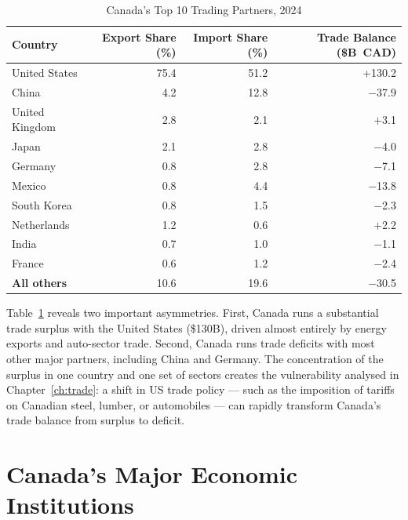 \begin{table}[H]
\centering
\caption{Canada's Top 10 Trading Partners, 2024}
\label{tab:trading_partners}
\renewcommand{\arraystretch}{1.35}
\begin{tabular}{lrrr}
\toprule
\textbf{Country} & \textbf{Export Share (\%)} & \textbf{Import Share (\%)}
                 & \textbf{Trade Balance (\$B~CAD)} \\
\midrule
United States    & 75.4 & 51.2 & +130.2 \\
China            &  4.2 & 12.8 & $-$37.9 \\
United Kingdom   &  2.8 &  2.1 & $+$3.1 \\
Japan            &  2.1 &  2.8 & $-$4.0 \\
Germany          &  0.8 &  2.8 & $-$7.1 \\
Mexico           &  0.8 &  4.4 & $-$13.8 \\
South Korea      &  0.8 &  1.5 & $-$2.3 \\
Netherlands      &  1.2 &  0.6 & $+$2.2 \\
India            &  0.7 &  1.0 & $-$1.1 \\
France           &  0.6 &  1.2 & $-$2.4 \\
\midrule
\textbf{All others} & 10.6 & 19.6 & $-$30.5 \\
\bottomrule
\end{tabular}
\end{table}

\noindent Table~\ref{tab:trading_partners} reveals two important asymmetries.
First, Canada runs a substantial trade surplus with the United States (\$130B),
driven almost entirely by energy exports and auto-sector trade. Second, Canada
runs trade deficits with most other major partners, including China and Germany.
The concentration of the surplus in one country and one set of sectors creates
the vulnerability analysed in Chapter~\ref{ch:trade}: a shift in US trade
policy --- such as the imposition of tariffs on Canadian steel, lumber, or
automobiles --- can rapidly transform Canada's trade balance from surplus
to deficit.

\section{Canada's Major Economic Institutions}
\label{sec:institutions}

